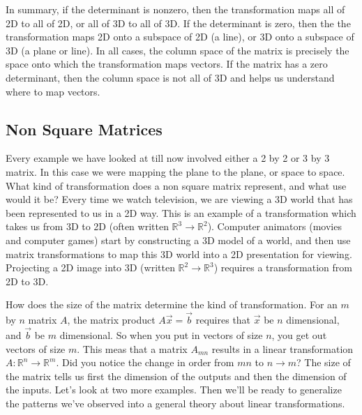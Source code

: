 In summary, if the determinant is nonzero, then the transformation maps all of 2D to all of 2D, or all of 3D to all of 3D.  
If the determinant is zero, then the the transformation maps 2D onto a subspace of 2D (a line), or 3D onto a subspace of 3D (a plane or line).  
In all cases, the column space of the matrix is precisely the space onto which the transformation maps vectors. 
If the matrix has a zero determinant, then the column space is not all of 3D and helps us understand where to map vectors.  

\subsection{Non Square Matrices}

Every example we have looked at till now involved either a 2 by 2 or 3 by 3 matrix.  
In this case we were mapping the plane to the plane, or space to space. 
What kind of transformation does a non square matrix represent, and what use would it be?  
Every time we watch television, we are viewing a 3D world that has been represented to us in a 2D way.  
This is an example of a transformation which takes us from 3D to 2D (often written $\mathbb{R}^3\to \mathbb{R}^2$).  
Computer animators (movies and computer games) start by constructing a 3D model of a world, and then use matrix transformations to map this 3D world into a 2D presentation for viewing. 
Projecting a 2D image into 3D (written $\mathbb{R}^2\to \mathbb{R}^3$) requires a transformation from 2D to 3D. 

How does the size of the matrix determine the kind of transformation.  
For an $m$ by $n$ matrix $A$, the matrix product $A\vec x = \vec b$ requires that $\vec x$ be $n$ dimensional, and $\vec b$ be $m$ dimensional.  
So when you put in vectors of size $n$, you get out vectors of size $m$.  
This meas that a matrix $A_{mn}$ results in a linear transformation $A:\mathbb{R}^n\to\mathbb{R}^m$. 
Did you notice the change in order from $mn$ to $n\to m$? 
The size of the matrix tells us first the dimension of the outputs and then the dimension of the inputs.
Let's look at two more examples.  
Then we'll be ready to generalize the patterns we've observed into a general theory about linear transformations.  

